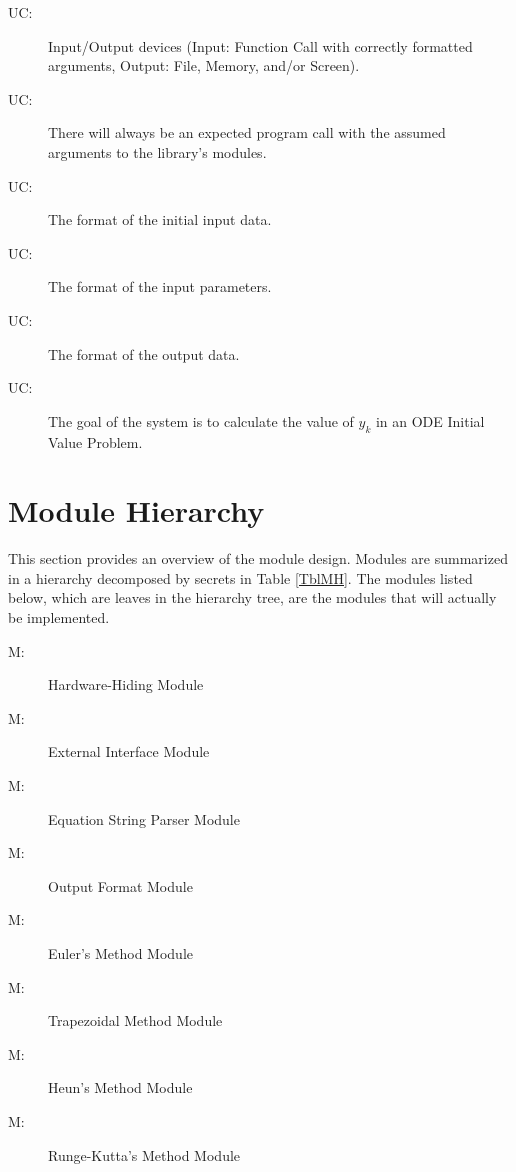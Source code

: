 \documentclass[12pt, titlepage]{article}
\newcounter{ucnum}
\newcommand{\uctheucnum}{UC\theucnum}
\newcounter{mnum}
\newcommand{\mthemnum}{M\themnum}
\begin{document}
\begin{description}
\item[ \uctheucnum \label{ucIO}:] Input/Output devices
  (Input: Function Call with correctly formatted arguments, Output: File, Memory, and/or Screen).
\item[ \uctheucnum \label{ucInput}:] There will always be
an expected program call with the assumed arguments to the library's modules.
\item[ \uctheucnum \label{ucInput}:] The format of the
  initial input data.
\item[ \uctheucnum \label{ucInputParams}:] The format
of the input parameters.
\item[ \uctheucnum \label{ucOutput}:] The format of the output data.
\item[ \uctheucnum \label{ucGoal}:] The goal of the system is to
calculate the value of $y_k$ in an ODE Initial Value Problem.
\end{description}

\section{Module Hierarchy} \label{SecMH}

This section provides an overview of the module design. Modules are summarized
in a hierarchy decomposed by secrets in Table \ref{TblMH}. The modules listed
below, which are leaves in the hierarchy tree, are the modules that will
actually be implemented.

\begin{description}
\item [ \mthemnum \label{mHH}:] Hardware-Hiding Module
\item [ \mthemnum \label{mExt}:] External Interface Module
\item [ \mthemnum \label{mODEParse}:] Equation String Parser Module
\item [ \mthemnum \label{mOutputFormat}:] Output Format Module
\item [ \mthemnum \label{mEuler}:] Euler's Method Module
\item [ \mthemnum \label{mTrap}:] Trapezoidal Method Module
\item [ \mthemnum \label{mHeun}:] Heun's Method Module
\item [ \mthemnum \label{mRK}:] Runge-Kutta's Method Module

\end{description}
\end{document}
